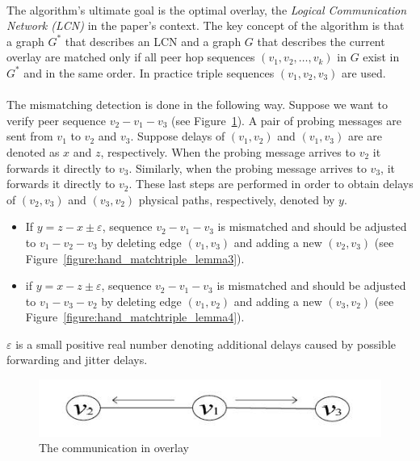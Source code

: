 \documentclass[a4paper,10pt]{article}
\begin{document}
\paragraph{}
The algorithm's ultimate goal is the optimal overlay, the \emph{Logical Communication Network (LCN)} in the paper's context. The key concept of the algorithm is that a graph $G^{*}$ that describes an LCN and a graph $G$ that describes the current overlay are matched only if all peer hop sequences $(v_1, v_2, \ldots, v_k)$ in $G$ exist in $G^{*}$ and in the same order. In practice triple sequences $(v_1, v_2, v_3)$ are used.

\paragraph{}
The mismatching detection is done in the following way. Suppose we want to verify peer sequence $v_2-v_1-v_3$ (see Figure~\ref{figure:hand_com_overlay}). A pair of probing messages are sent from $v_1$ to $v_2$ and $v_3$. Suppose delays of $(v_1,v_2)$ and $(v_1,v_3)$ are are denoted as $x$ and $z$, respectively. When the probing message arrives to $v_2$ it forwards it directly to $v_3$. Similarly, when the probing message arrives to $v_3$, it forwards it directly to $v_2$. These last steps are performed in order to obtain delays of $(v_2,v_3)$ and $(v_3,v_2)$ physical paths, respectively, denoted by $y$.
\begin{itemize}
  \item If $y=z-x\pm\varepsilon$, sequence $v_2-v_1-v_3$ is mismatched and should be adjusted to $v_1-v_2-v_3$ by deleting edge $(v_1,v_3)$ and adding a new $(v_2,v_3)$ (see Figure~\ref{figure:hand_matchtriple_lemma3}).
  \item if $y=x-z\pm\varepsilon$, sequence $v_2-v_1-v_3$ is mismatched and should be adjusted to $v_1-v_3-v_2$ by deleting edge $(v_1,v_2)$ and adding a new $(v_3,v_2)$ (see Figure~\ref{figure:hand_matchtriple_lemma4}).
\end{itemize}
$\varepsilon$ is a small positive real number denoting additional delays caused by possible forwarding and jitter delays.

\begin{figure}
\centering
  \includegraphics[scale=0.4]{img/hand_com_overlay.jpeg}
\caption{The communication in overlay}
\label{figure:hand_com_overlay}
\end{figure}
\end{document}
